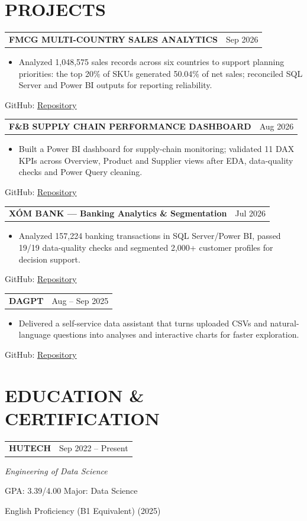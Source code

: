 \documentclass[10pt,letterpaper]{article}
\makeatletter
\newcommand{\cvsection}[2]{\section*{\faIcon{#1}\hspace{0.45em}#2}}
\newcommand{\cvlink}[2]{\href{#1}{\underline{#2}}}
\newcommand{\projectentry}[4]{%
  \begin{tabularx}{\textwidth}{@{}X>{\raggedleft\arraybackslash}p{1.52in}@{}}
    \textbf{#1} & \normalsize #2 \\
  \end{tabularx}\par
  \begin{itemize}[leftmargin=1.75em,itemsep=0em,topsep=0.08em,parsep=0em,partopsep=0em]
    \item \small #3
  \end{itemize}
  \small\hspace{1.15em}GitHub: \cvlink{#4}{Repository}\par
}
\makeatother
\begin{document}
\cvsection{briefcase}{PROJECTS}
\projectentry{FMCG MULTI-COUNTRY SALES ANALYTICS}{Sep 2026}{Analyzed 1,048,575 sales records across six countries to support planning priorities: the top 20\% of SKUs generated 50.04\% of net sales; reconciled SQL Server and Power BI outputs for reporting reliability.}{https://github.com/lehoanggiavi/FMCGMultiCountrySalesDataset}
\vspace{0.16em}
\projectentry{F\&B SUPPLY CHAIN PERFORMANCE DASHBOARD}{Aug 2026}{Built a Power BI dashboard for supply-chain monitoring; validated 11 DAX KPIs across Overview, Product and Supplier views after EDA, data-quality checks and Power Query cleaning.}{https://github.com/lehoanggiavi/F-B-Supply-Chain}
\vspace{0.16em}
\projectentry{XÓM BANK --- Banking Analytics \& Segmentation}{Jul 2026}{Analyzed 157,224 banking transactions in SQL Server/Power BI, passed 19/19 data-quality checks and segmented 2,000+ customer profiles for decision support.}{https://github.com/lehoanggiavi/Banking}
\vspace{0.16em}
\projectentry{DAGPT}{Aug -- Sep 2025}{Delivered a self-service data assistant that turns uploaded CSVs and natural-language questions into analyses and interactive charts for faster exploration.}{https://github.com/lehoanggiavi/dagpt}

\cvsection{graduation-cap}{EDUCATION \& CERTIFICATION}
\begin{tabularx}{\textwidth}{@{}X>{\raggedleft\arraybackslash}p{1.52in}@{}}
  \textbf{HUTECH} & \normalsize Sep 2022 -- Present \\
\end{tabularx}\par
\small\textit{Engineering of Data Science}\par
\small GPA: 3.39/4.00 \quad\textbullet\quad Major: Data Science\par
\small English Proficiency (B1 Equivalent) (2025)
\end{document}
